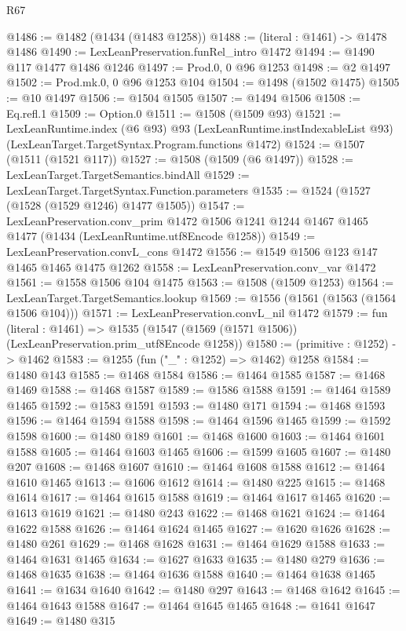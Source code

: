 \begin{lexlean}{R67}
\begin{coremodule}
@1486 := @1482 (@1434 (@1483 @1258))
@1488 := (literal : @1461) -> @1478 @1486
@1490 := LexLeanPreservation.funRel_intro @1472
@1494 := @1490 @117 @1477 @1486 @1246
@1497 := Prod.{0, 0} @96 @1253
@1498 := @2 @1497
@1502 := Prod.mk.{0, 0} @96 @1253 @104
@1504 := @1498 (@1502 @1475)
@1505 := @10 @1497
@1506 := @1504 @1505
@1507 := @1494 @1506
@1508 := Eq.refl.{1}
@1509 := Option.{0}
@1511 := @1508 (@1509 @93)
@1521 := LexLeanRuntime.index
    (@6 @93)
    @93
    (LexLeanRuntime.instIndexableList @93)
    (LexLeanTarget.TargetSyntax.Program.functions @1472)
@1524 := @1507 (@1511 (@1521 @117))
@1527 := @1508 (@1509 (@6 @1497))
@1528 := LexLeanTarget.TargetSemantics.bindAll
@1529 := LexLeanTarget.TargetSyntax.Function.parameters
@1535 := @1524 (@1527 (@1528 (@1529 @1246) @1477 @1505))
@1547 := LexLeanPreservation.conv_prim
    @1472
    @1506
    @1241
    @1244
    @1467
    @1465
    @1477
    (@1434 (LexLeanRuntime.utf8Encode @1258))
@1549 := LexLeanPreservation.convL_cons @1472
@1556 := @1549 @1506 @123 @147 @1465 @1465 @1475 @1262
@1558 := LexLeanPreservation.conv_var @1472
@1561 := @1558 @1506 @104 @1475
@1563 := @1508 (@1509 @1253)
@1564 := LexLeanTarget.TargetSemantics.lookup
@1569 := @1556 (@1561 (@1563 (@1564 @1506 @104)))
@1571 := LexLeanPreservation.convL_nil @1472
@1579 := fun (literal : @1461) =>
  @1535 (@1547 (@1569 (@1571 @1506)) (LexLeanPreservation.prim_utf8Encode @1258))
@1580 := (primitive : @1252) -> @1462
@1583 := @1255 (fun ("_" : @1252) => @1462) @1258
@1584 := @1480 @143
@1585 := @1468 @1584
@1586 := @1464 @1585
@1587 := @1468 @1469
@1588 := @1468 @1587
@1589 := @1586 @1588
@1591 := @1464 @1589 @1465
@1592 := @1583 @1591
@1593 := @1480 @171
@1594 := @1468 @1593
@1596 := @1464 @1594 @1588
@1598 := @1464 @1596 @1465
@1599 := @1592 @1598
@1600 := @1480 @189
@1601 := @1468 @1600
@1603 := @1464 @1601 @1588
@1605 := @1464 @1603 @1465
@1606 := @1599 @1605
@1607 := @1480 @207
@1608 := @1468 @1607
@1610 := @1464 @1608 @1588
@1612 := @1464 @1610 @1465
@1613 := @1606 @1612
@1614 := @1480 @225
@1615 := @1468 @1614
@1617 := @1464 @1615 @1588
@1619 := @1464 @1617 @1465
@1620 := @1613 @1619
@1621 := @1480 @243
@1622 := @1468 @1621
@1624 := @1464 @1622 @1588
@1626 := @1464 @1624 @1465
@1627 := @1620 @1626
@1628 := @1480 @261
@1629 := @1468 @1628
@1631 := @1464 @1629 @1588
@1633 := @1464 @1631 @1465
@1634 := @1627 @1633
@1635 := @1480 @279
@1636 := @1468 @1635
@1638 := @1464 @1636 @1588
@1640 := @1464 @1638 @1465
@1641 := @1634 @1640
@1642 := @1480 @297
@1643 := @1468 @1642
@1645 := @1464 @1643 @1588
@1647 := @1464 @1645 @1465
@1648 := @1641 @1647
@1649 := @1480 @315

\end{coremodule}
\end{lexlean}
